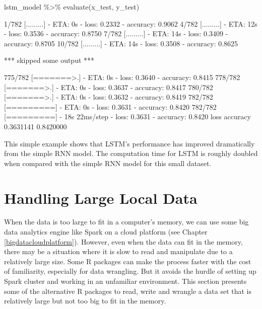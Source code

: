 \documentclass[
  12pt,
]{krantz}
\makeatletter
\newenvironment{Shaded}{\begin{snugshade}}{\end{snugshade}}
\newcommand{\FunctionTok}[1]{\textcolor[rgb]{0,0,0}{#1}}
\newcommand{\NormalTok}[1]{#1}
\newcommand{\SpecialCharTok}[1]{\textcolor[rgb]{0,0,0}{#1}}
\newenvironment{kframe}{%
\medskip{}
\setlength{\fboxsep}{.8em}
 \def\at@end@of@kframe{}%
 \ifinner\ifhmode%
  \def\at@end@of@kframe{\end{minipage}}%
  \begin{minipage}{\columnwidth}%
 \fi\fi%
 \def\FrameCommand##1{\hskip\@totalleftmargin \hskip-\fboxsep
 \colorbox{shadecolor}{##1}\hskip-\fboxsep
     \hskip-\linewidth \hskip-\@totalleftmargin \hskip\columnwidth}%
 \MakeFramed {\advance\hsize-\width
   \@totalleftmargin\z@ \linewidth\hsize
   \@setminipage}}%
 {\par\unskip\endMakeFramed%
 \at@end@of@kframe}
\renewenvironment{Shaded}{\begin{kframe}}{\end{kframe}}
\makeatother
\begin{document}
\begin{Shaded}
\begin{Highlighting}[]
\NormalTok{lstm\_model }\SpecialCharTok{\%\textgreater{}\%} 
   \FunctionTok{evaluate}\NormalTok{(x\_test, y\_test)}
\end{Highlighting}
\end{Shaded}

\begin{Shaded}
\begin{Highlighting}[]
\NormalTok{  1/782 [.........] {-} ETA: 0s  {-} loss: 0.2332 {-} accuracy: 0.9062}
\NormalTok{  4/782 [.........] {-} ETA: 12s {-} loss: 0.3536 {-} accuracy: 0.8750}
\NormalTok{  7/782 [.........] {-} ETA: 14s {-} loss: 0.3409 {-} accuracy: 0.8705}
\NormalTok{ 10/782 [.........] {-} ETA: 14s {-} loss: 0.3508 {-} accuracy: 0.8625}

\NormalTok{*** skipped some output ***}

\NormalTok{775/782 [=======\textgreater{}.] {-} ETA: 0s {-} loss: 0.3640 {-} accuracy: 0.8415}
\NormalTok{778/782 [=======\textgreater{}.] {-} ETA: 0s {-} loss: 0.3637 {-} accuracy: 0.8417}
\NormalTok{780/782 [=======\textgreater{}.] {-} ETA: 0s {-} loss: 0.3632 {-} accuracy: 0.8419}
\NormalTok{782/782 [=========] {-} ETA: 0s {-} loss: 0.3631 {-} accuracy: 0.8420}
\NormalTok{782/782 [=========] {-} 18s 22ms/step {-} loss: 0.3631 {-} accuracy: 0.8420}
\NormalTok{     loss  accuracy }
\NormalTok{0.3631141 0.8420000 }
\end{Highlighting}
\end{Shaded}

This simple example shows that LSTM's performance has improved dramatically from the simple RNN model. The computation time for LSTM is roughly doubled when compared with the simple RNN model for this small dataset.

\hypertarget{appendix-appendix}{%
\appendix {}}


\hypertarget{largelocaldata}{%
\chapter{Handling Large Local Data}\label{largelocaldata}}

When the data is too large to fit in a computer's memory, we can use some big data analytics engine like Spark on a cloud platform (see Chapter \ref{bigdatacloudplatform}). However, even when the data can fit in the memory, there may be a situation where it is slow to read and manipulate due to a relatively large size. Some R packages can make the process faster with the cost of familiarity, especially for data wrangling. But it avoids the hurdle of setting up Spark cluster and working in an unfamiliar environment. This section presents some of the alternative R packages to read, write and wrangle a data set that is relatively large but not too big to fit in the memory.
\end{document}

